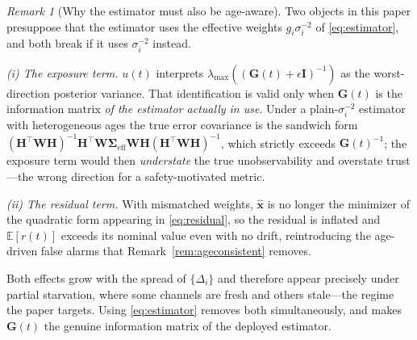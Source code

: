 \documentclass[journal]{IEEEtran}
\theoremstyle{plain}
\theoremstyle{definition}
\theoremstyle{remark}
\newtheorem{remark}{Remark}
\newcommand{\bxh}{\hat{\mathbf{x}}}
\newcommand{\bH}{\mathbf{H}}
\newcommand{\bG}{\mathbf{G}}
\newcommand{\bW}{\mathbf{W}}
\newcommand{\bI}{\mathbf{I}}
\newcommand{\lmax}{\lambda_{\max}}
\newcommand{\bSigma}{\boldsymbol{\Sigma}}
\begin{document}
\begin{remark}[Why the estimator must also be age-aware]
\label{rem:estcoupling}
Two objects in this paper presuppose that the estimator uses the effective
weights $g_i\sigma_i^{-2}$ of \eqref{eq:estimator}, and both break if it
uses $\sigma_i^{-2}$ instead.

\emph{(i) The exposure term.} $u(t)$ interprets
$\lmax((\bG(t)+\epsilon\bI)^{-1})$ as the worst-direction posterior
variance. That identification is valid only when $\bG(t)$ is the
information matrix \emph{of the estimator actually in use}. Under a
plain-$\sigma_i^{-2}$ estimator with heterogeneous ages the true error
covariance is the sandwich form
$(\bH^{\top}\bW\bH)^{-1}\bH^{\top}\bW\bSigma_{\mathrm{eff}}\bW\bH(\bH^{\top}\bW\bH)^{-1}$,
which strictly exceeds $\bG(t)^{-1}$; the exposure term would then
\emph{understate} the true unobservability and overstate trust---the wrong
direction for a safety-motivated metric.

\emph{(ii) The residual term.} With mismatched weights, $\bxh$ is no longer
the minimizer of the quadratic form appearing in \eqref{eq:residual}, so
the residual is inflated and $\mathbb{E}[r(t)]$ exceeds its nominal value
even with no drift, reintroducing the age-driven false alarms that
Remark~\ref{rem:ageconsistent} removes.

Both effects grow with the spread of $\{\Delta_i\}$ and therefore appear
precisely under partial starvation, where some channels are fresh and
others stale---the regime the paper targets. Using \eqref{eq:estimator}
removes both simultaneously, and makes $\bG(t)$ the genuine information
matrix of the deployed estimator.
\end{remark}
\end{document}
